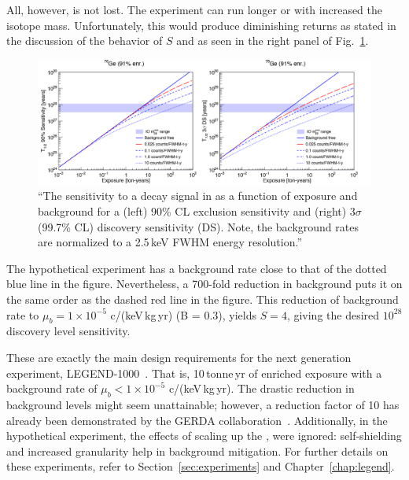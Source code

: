 All, however, is not lost. The experiment can run longer or with increased the isotope mass. Unfortunately, this would produce diminishing returns as stated in the discussion of the behavior of $S$ and as seen in the right panel of Fig.~\ref{fig:legend_sensitivity}.  
\begin{figure}[htb]
	\centering
	\includegraphics[width=6in]{figs/legend/legend_sensitivity.pdf}
	\caption{``The sensitivity to a \novbb{} decay signal in \geEn{} as a function of exposure and background for a (left) 90\% CL exclusion sensitivity and (right) 3$\sigma$ (99.7\% CL) discovery sensitivity (DS). Note, the background rates are normalized to a 2.5\,keV FWHM energy resolution.''~\cite{legend_pcdr}}
	\label{fig:legend_sensitivity}
\end{figure}
The hypothetical experiment has a background rate close to that of the dotted blue line in the figure. Nevertheless, a 700-fold reduction in background puts it on the same order as the dashed red line in the figure. This reduction of background rate to $\mu_b = 1 \times 10^{-5}$ c/(keV\,kg\,yr) (B = 0.3), yields $S = 4$, giving the desired $10^{28}$ discovery level sensitivity.

These are exactly the main design requirements for the next generation \novbb{} \geEn{} experiment, LEGEND-1000~\cite{legend}. That is, 10\,tonne\,yr of enriched exposure with a background rate  of $\mu_b < 1 \times 10^{-5}$ c/(keV\,kg\,yr). The drastic reduction in background levels might seem unattainable; however, a reduction factor of 10 has already been demonstrated by the GERDA collaboration~\cite{GERDA2020}. Additionally, in the hypothetical experiment, the effects of scaling up the {\MJDEMit}, were ignored: self-shielding and increased granularity help in background mitigation. For further details on these experiments, refer to Section~\ref{sec:experiments} and Chapter~\ref{chap:legend}.

